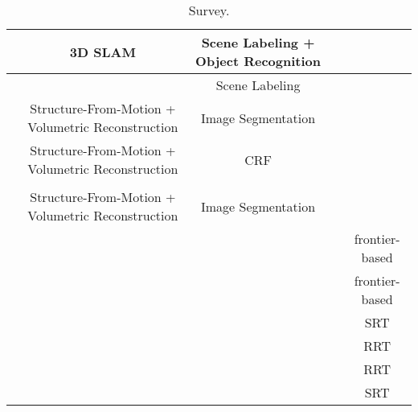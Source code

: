 \documentclass[a4paper,landscape]{article}
\begin{document}
\begin{table}[h]
{\begin{tabular}{|l|c|c|c|c|}
			\hline 			 
			\cite{nuchter2008ras} & 3D SLAM & Scene Labeling + Object Recognition &  &   \\ 
			\hline 			 
			\cite{xiong2010bmvc} &  & Scene Labeling &  &   \\ 
			\hline 			 
			\cite{blaha2016cvpr} & Structure-From-Motion + Volumetric Reconstruction & Image Segmentation &  &  \\ 
			\hline 			 
			\cite{kundu2014eccv} & Structure-From-Motion + Volumetric Reconstruction & CRF &  &   \\ 
			\hline 			 
			\cite{sengupta2013icra} &  &  &  &   \\ 
			\hline 			 
			\cite{hane2013cvpr} & Structure-From-Motion + Volumetric Reconstruction & Image Segmentation &  &   \\ 
			\hline 			 
			\cite{yamauchi1997cira,yamauchi1998frontier,wang2011frontier} &  &  &  &  frontier-based  \\ 
			\hline 			 
			\cite{senarathne2013efficient,keidar2012robot} &  &  &  &  frontier-based  \\ 
			\hline 			 
			\cite{oriolo2004icra,freda2005icra} &  &  &  & SRT \\ 
			\hline 			 
			\cite{lavalle1998rapidly} &  &  &  &  RRT \\ 
			\hline 			
			\cite{bircher2016icra} & & &  &  RRT  \\ 
			\hline 			 
			\cite{el2013improved,franchi2009sensor} &  &  &  &  SRT \\ 
			\hline 			 
		\end{tabular}
		}
		\caption{Survey.}
		\label{tab:survey}
	\end{table}
	
	\clearpage
	
	
	
\end{document}
